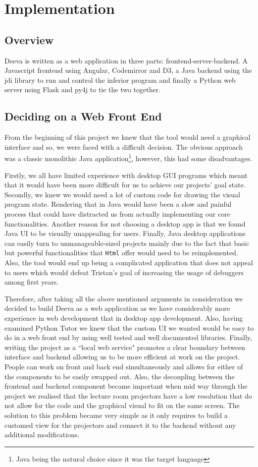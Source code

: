 \documentclass[11pt, a4paper]{article}
\begin{document}
\section{Implementation}

\subsection{Overview}
Deeva is written as a web application in three parts: frontend-server-backend.
A Javascript frontend using Angular, Codemirror and D3, a Java backend using the jdi library to run and control the inferior program and finally a Python web server using Flask and py4j to tie the two together.

\subsection{Deciding on a Web Front End}
From the beginning of this project we knew that the tool would need a graphical interface and so, we were faced with a difficult decision.
The obvious approach was a classic monolithic Java application\footnote{Java being the natural choice since it was the target language}, however, this had some disadvantages.

Firstly, we all have limited experience with desktop GUI programs which meant that it would have been more difficult for us to achieve our projects' goal state.
Secondly, we knew we would need a lot of custom code for drawing the visual program state.
Rendering that in Java would have been a slow and painful process that could have distracted us from actually implementing our core functionalities.
Another reason for not choosing a desktop app is that we found Java UI to be visually unappealing for users.
Finally, Java desktop applications can easily turn to unmanageable-sized projects mainly due to the fact that basic but powerful functionalities that \texttt{Html} offer would need to be reimplemented.
Also, the tool would end up being a complicated application that does not appeal to users which would defeat Tristan's goal of increasing the usage of debuggers among first years.

Therefore, after taking all the above mentioned arguments in consideration we decided to build Deeva as a web application as we have considerably more experience in web development that in desktop app development.
Also, having examined Python Tutor we knew that the custom UI we wanted would be easy to do in a web front end by using well tested and well documented libraries.
Finally, writing the project as a ``local web service" promotes a clear boundary between interface and backend allowing us to be more efficient at work on the project.
People can work on front and back end simultaneously and allows for either of the components to be easily swapped out.
Also, the decoupling between the frontend and backend component became important when mid way through the project we realised that the lecture room projectors have a low resolution that do not allow for the code and the graphical visual to fit on the same screen.
The solution to this problem became very simple as it only requires to build a customed view for the projectors and connect it to the backend without any additional modifications.
\end{document}
